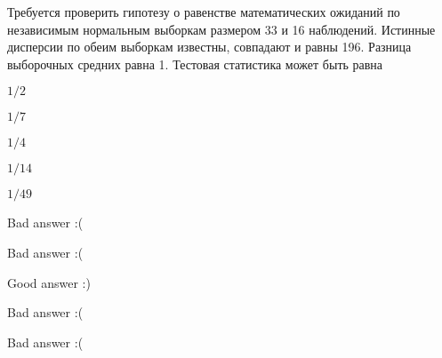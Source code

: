 
\begin{question}
Требуется проверить гипотезу о равенстве математических ожиданий по
независимым нормальным выборкам размером 33 и 16 наблюдений. Истинные
дисперсии по обеим выборкам известны, совпадают и равны 196. Разница
выборочных средних равна 1. Тестовая статистика может быть равна
\begin{answerlist}
  \item \(1/2\)
  \item \(1/7\)
  \item \(1/4\)
  \item \(1/14\)
  \item \(1/49\)
\end{answerlist}
\end{question}

\begin{solution}
\begin{answerlist}
  \item Bad answer :(
  \item Bad answer :(
  \item Good answer :)
  \item Bad answer :(
  \item Bad answer :(
\end{answerlist}
\end{solution}

